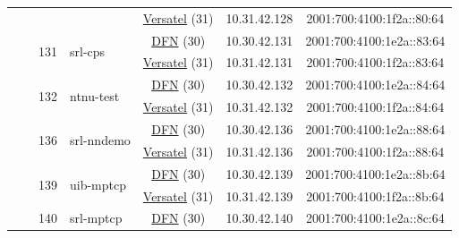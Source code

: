 \begin{small}
\begin{center}
\begin{longtable}{|c|c|c|c|c|c|c|c|}
  &  &  &  & \multicolumn{2}{|c|}{\tiny{\href{http://www.versatel.de}{Versatel} (31)}} & \tiny{10.31.42.128} & \tiny{2001:700:4100:1f2a::80:64} \\* \cline{3-3}\cline{4-4}\cline{5-5}\cline{6-6}\cline{7-7}\cline{8-8}
  &  & \multirow{2}{*}{\tiny{131}} & \multicolumn{1}{|l|}{\multirow{2}{*}{\tiny{srl-cps}}} & \multicolumn{2}{|c|}{\tiny{\href{https://www.dfn.de}{DFN} (30)}} & \tiny{10.30.42.131} & \tiny{2001:700:4100:1e2a::83:64} \\* \cline{5-5}\cline{6-6}\cline{7-7}\cline{8-8}
  &  &  &  & \multicolumn{2}{|c|}{\tiny{\href{http://www.versatel.de}{Versatel} (31)}} & \tiny{10.31.42.131} & \tiny{2001:700:4100:1f2a::83:64} \\* \cline{3-3}\cline{4-4}\cline{5-5}\cline{6-6}\cline{7-7}\cline{8-8}
  &  & \multirow{2}{*}{\tiny{132}} & \multicolumn{1}{|l|}{\multirow{2}{*}{\tiny{ntnu-test}}} & \multicolumn{2}{|c|}{\tiny{\href{https://www.dfn.de}{DFN} (30)}} & \tiny{10.30.42.132} & \tiny{2001:700:4100:1e2a::84:64} \\* \cline{5-5}\cline{6-6}\cline{7-7}\cline{8-8}
  &  &  &  & \multicolumn{2}{|c|}{\tiny{\href{http://www.versatel.de}{Versatel} (31)}} & \tiny{10.31.42.132} & \tiny{2001:700:4100:1f2a::84:64} \\* \cline{3-3}\cline{4-4}\cline{5-5}\cline{6-6}\cline{7-7}\cline{8-8}
  &  & \multirow{2}{*}{\tiny{136}} & \multicolumn{1}{|l|}{\multirow{2}{*}{\tiny{srl-nndemo}}} & \multicolumn{2}{|c|}{\tiny{\href{https://www.dfn.de}{DFN} (30)}} & \tiny{10.30.42.136} & \tiny{2001:700:4100:1e2a::88:64} \\* \cline{5-5}\cline{6-6}\cline{7-7}\cline{8-8}
  &  &  &  & \multicolumn{2}{|c|}{\tiny{\href{http://www.versatel.de}{Versatel} (31)}} & \tiny{10.31.42.136} & \tiny{2001:700:4100:1f2a::88:64} \\* \cline{3-3}\cline{4-4}\cline{5-5}\cline{6-6}\cline{7-7}\cline{8-8}
  &  & \multirow{2}{*}{\tiny{139}} & \multicolumn{1}{|l|}{\multirow{2}{*}{\tiny{uib-mptcp}}} & \multicolumn{2}{|c|}{\tiny{\href{https://www.dfn.de}{DFN} (30)}} & \tiny{10.30.42.139} & \tiny{2001:700:4100:1e2a::8b:64} \\* \cline{5-5}\cline{6-6}\cline{7-7}\cline{8-8}
  &  &  &  & \multicolumn{2}{|c|}{\tiny{\href{http://www.versatel.de}{Versatel} (31)}} & \tiny{10.31.42.139} & \tiny{2001:700:4100:1f2a::8b:64} \\* \cline{3-3}\cline{4-4}\cline{5-5}\cline{6-6}\cline{7-7}\cline{8-8}
  &  & \multirow{2}{*}{\tiny{140}} & \multicolumn{1}{|l|}{\multirow{2}{*}{\tiny{srl-mptcp}}} & \multicolumn{2}{|c|}{\tiny{\href{https://www.dfn.de}{DFN} (30)}} & \tiny{10.30.42.140} & \tiny{2001:700:4100:1e2a::8c:64} \\* \cline{5-5}\cline{6-6}\cline{7-7}\cline{8-8}

\end{longtable}
\end{center}
\end{small}
